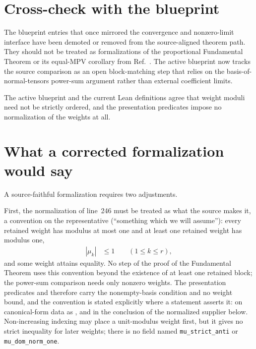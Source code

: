 \documentclass{article}
\begin{document}
\section{Cross-check with the blueprint}

The blueprint entries that once mirrored the convergence and nonzero-limit
interface have been demoted or removed from the source-aligned theorem path.
They should not be treated as formalizations of the proportional Fundamental
Theorem or its equal-MPV corollary from Ref.~\cite{Cirac2016MPDO_arXiv}. The
active blueprint now tracks the source comparison as an open block-matching
step that relies on the basis-of-normal-tensors power-sum argument rather than
external coefficient limits.

The active blueprint and the current Lean definitions agree that weight moduli
need not be strictly ordered, and the presentation predicates impose no
normalization of the weights at all.

\section{What a corrected formalization would say}

A source-faithful formalization requires two adjustments.

First, the normalization of line~246 must be treated as what the source makes
it, a convention on the representative (``something which we will assume''):
every retained weight has modulus at most one and at least one retained weight
has modulus one,
\begin{align}
    |\mu_k|
        &\leq 1
        \qquad (1\leq k\leq r),
    \label{eq:cpsv16_cf_normalization_and_proportional_comparison_all_weight_bound}
\end{align}
and some weight attains equality. No step of the proof of the Fundamental
Theorem uses this convention beyond the existence of at least one retained
block; the power-sum comparison needs only nonzero weights. The presentation
predicates  and
 therefore carry the
nonempty-basis condition and no weight bound, and the convention is stated
explicitly where a statement asserts it: on canonical-form data as
, and in the
conclusion of the normalized supplier below. Non-increasing indexing may place
a unit-modulus weight first, but it gives no strict inequality for later
weights; there is no field named \texttt{mu\_strict\_anti} or
\texttt{mu\_dom\_norm\_one}.
\end{document}
